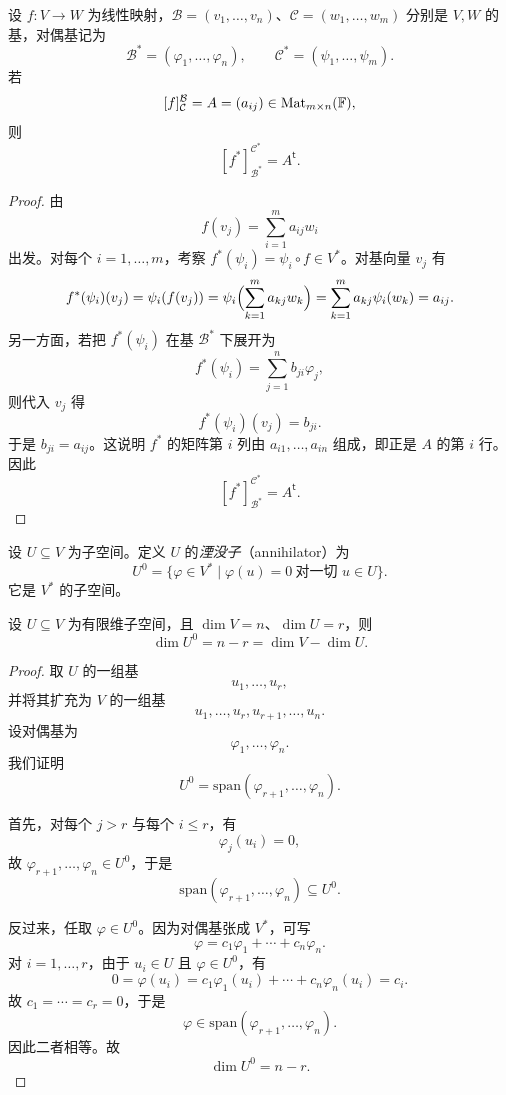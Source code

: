 \begin{theorem}
设 $f\colon V\to W$ 为线性映射，$\mathcal B=(v_1,\dots,v_n)$、$\mathcal C=(w_1,\dots,w_m)$ 分别是 $V,W$ 的基，对偶基记为
\[
  \mathcal B^*=(\varphi_1,\dots,\varphi_n),
  \qquad
  \mathcal C^*=(\psi_1,\dots,\psi_m).
\]
若
\[
  [f]_{\mathcal C}^{\mathcal B}=A=(a_{ij})\in \mathrm{Mat}_{m\times n}(\mathbb{F}),
\]
则
\[
  [f^*]_{\mathcal B^*}^{\mathcal C^*}=A^\mathsf{t}.
\]
\end{theorem}

\begin{proof}
由
\[
  f(v_j)=\sum_{i=1}^m a_{ij}w_i
\]
出发。对每个 $i=1,\dots,m$，考察 $f^*(\psi_i)=\psi_i\circ f\in V^*$。对基向量 $v_j$ 有
\[
  f^*(\psi_i)(v_j)=\psi_i(f(v_j))
  =\psi_i\Bigl(\sum_{k=1}^m a_{kj}w_k\Bigr)
  =\sum_{k=1}^m a_{kj}\psi_i(w_k)
  =a_{ij}.
\]
另一方面，若把 $f^*(\psi_i)$ 在基 $\mathcal B^*$ 下展开为
\[
  f^*(\psi_i)=\sum_{j=1}^n b_{ji}\varphi_j,
\]
则代入 $v_j$ 得
\[
  f^*(\psi_i)(v_j)=b_{ji}.
\]
于是 $b_{ji}=a_{ij}$。这说明 $f^*$ 的矩阵第 $i$ 列由 $a_{i1},\dots,a_{in}$ 组成，即正是 $A$ 的第 $i$ 行。因此
\[
  [f^*]_{\mathcal B^*}^{\mathcal C^*}=A^\mathsf{t}.
\]
\end{proof}

\begin{center}
\end{center}

\begin{definition}
设 $U\subseteq V$ 为子空间。定义 $U$ 的\emph{湮没子}（annihilator）为
\[
  U^0=\{\varphi\in V^*\mid \varphi(u)=0\ \text{对一切 }u\in U\}.
\]
它是 $V^*$ 的子空间。
\end{definition}

\begin{proposition}
设 $U\subseteq V$ 为有限维子空间，且 $\dim V=n$、$\dim U=r$，则
\[
  \dim U^0=n-r=\dim V-\dim U.
\]
\end{proposition}

\begin{proof}
取 $U$ 的一组基
\[
  u_1,\dots,u_r,
\]
并将其扩充为 $V$ 的一组基
\[
  u_1,\dots,u_r,u_{r+1},\dots,u_n.
\]
设对偶基为
\[
  \varphi_1,\dots,\varphi_n.
\]
我们证明
\[
  U^0=\mathrm{span}(\varphi_{r+1},\dots,\varphi_n).
\]

首先，对每个 $j>r$ 与每个 $i\le r$，有
\[
  \varphi_j(u_i)=0,
\]
故 $\varphi_{r+1},\dots,\varphi_n\in U^0$，于是
\[
  \mathrm{span}(\varphi_{r+1},\dots,\varphi_n)\subseteq U^0.
\]

反过来，任取 $\varphi\in U^0$。因为对偶基张成 $V^*$，可写
\[
  \varphi=c_1\varphi_1+\cdots+c_n\varphi_n.
\]
对 $i=1,\dots,r$，由于 $u_i\in U$ 且 $\varphi\in U^0$，有
\[
  0=\varphi(u_i)=c_1\varphi_1(u_i)+\cdots+c_n\varphi_n(u_i)=c_i.
\]
故 $c_1=\cdots=c_r=0$，于是
\[
  \varphi\in\mathrm{span}(\varphi_{r+1},\dots,\varphi_n).
\]
因此二者相等。故
\[
  \dim U^0=n-r.
\]
\end{proof}

